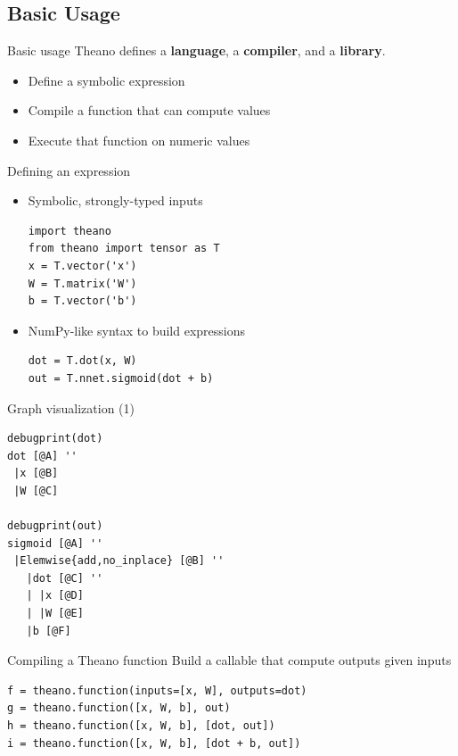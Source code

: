 \documentclass[a4paper,9pt]{beamer}
\begin{document}
\subsection{Basic Usage}
\begin{frame}{Basic usage}
  Theano defines a {\bf language}, a {\bf compiler}, and a {\bf library}.
  \begin{itemize}
    \item Define a symbolic expression
    \item Compile a function that can compute values
    \item Execute that function on numeric values
  \end{itemize}
\end{frame}

\begin{frame}[fragile]{Defining an expression}
  \begin{itemize}
    \item Symbolic, strongly-typed inputs
      \begin{verbatim}
import theano
from theano import tensor as T
x = T.vector('x')
W = T.matrix('W')
b = T.vector('b')
    \end{verbatim}
    \item NumPy-like syntax to build expressions
      \begin{verbatim}
dot = T.dot(x, W)
out = T.nnet.sigmoid(dot + b)
      \end{verbatim}
  \end{itemize}
\end{frame}

\begin{frame}[fragile]{Graph visualization (1)}
  \begin{verbatim}
debugprint(dot)
dot [@A] ''   
 |x [@B]
 |W [@C]

debugprint(out)
sigmoid [@A] ''   
 |Elemwise{add,no_inplace} [@B] ''   
   |dot [@C] ''   
   | |x [@D]
   | |W [@E]
   |b [@F]
  \end{verbatim}
\end{frame}

\begin{frame}[fragile]{Compiling a Theano function}
  Build a callable that compute outputs given inputs
  \begin{verbatim}
f = theano.function(inputs=[x, W], outputs=dot)
g = theano.function([x, W, b], out)
h = theano.function([x, W, b], [dot, out])
i = theano.function([x, W, b], [dot + b, out])
  \end{verbatim}
\end{frame}
\end{document}
